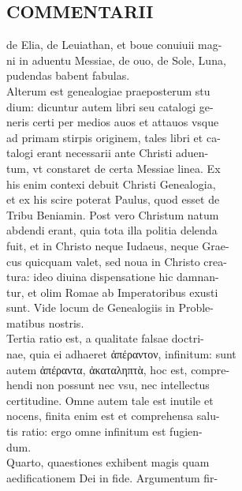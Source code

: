 \documentclass{article}
\begin{document}
\begin{pages}
\section*{COMMENTARII \\
                }de Elia, de Leuiathan, et boue conuiuii mag- \\
                ni in aduentu Messiae, de ouo, de Sole, Luna, \\
                pudendas babent fabulas. \\
                Alterum est genealogiae praeposterum stu \\
                dium: dicuntur autem libri seu catalogi ge- \\
                neris certi per medios auos et attauos vsque \\
                ad primam stirpis originem, tales libri et ca- \\
                talogi erant necessarii ante Christi aduen- \\
                tum, vt constaret de certa Messiae linea. Ex \\
                his enim contexi debuit Christi Genealogia, \\
                et ex his scire poterat Paulus, quod esset de \\
                Tribu Beniamin. Post vero Christum natum \\
                abdendi erant, quia tota illa politia delenda \\
                fuit, et in Christo neque Iudaeus, neque Grae- \\
                cus quicquam valet, sed noua in Christo crea- \\
                tura: ideo diuina dispensatione hic damnan- \\
                tur, et olim Romae ab Imperatoribus exusti \\
                sunt. Vide locum de Genealogiis in Proble- \\
                matibus nostris. \\
                Tertia ratio est, a qualitate falsae doctri- \\
                nae, quia ei adhaeret ἀπέραντον, infinitum: sunt \\
                autem ἀπέραντα, ἀκαταληπτὰ, hoc est, compre- \\
                hendi non possunt nec vsu, nec intellectus \\
                certitudine. Omne autem tale est inutile et \\
                nocens, finita enim est et comprehensa salu- \\
                tis ratio: ergo omne infinitum est fugien- \\
                dum. \\
                Quarto, quaestiones exhibent magis quam \\
                aedificationem Dei in fide. Argumentum fir- \\
                

\end{pages}
\end{document}
